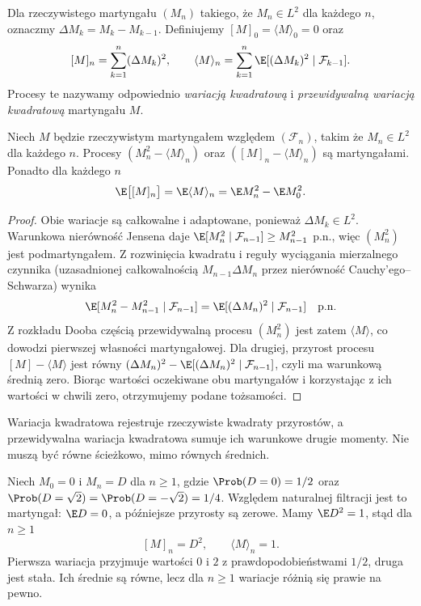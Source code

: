 \begin{definicja}
Dla rzeczywistego martyngału $(M_n)$ takiego,
że $M_n\in L^2$ dla każdego $n$, oznaczmy
$\Delta M_k=M_k-M_{k-1}$.
Definiujemy $[M]_0=\langle M\rangle_0=0$ oraz
\[
[M]_n=\sum_{k=1}^n(\Delta M_k)^2,\qquad
\langle M\rangle_n=\sum_{k=1}^n
\E[(\Delta M_k)^2\mid\mathcal F_{k-1}].
\]
Procesy te nazywamy odpowiednio \emph{wariacją
kwadratową} i \emph{przewidywalną wariacją
kwadratową} martyngału $M$.
\end{definicja}

\begin{stwierdzenie}
Niech $M$ będzie rzeczywistym martyngałem względem
$(\mathcal F_n)$, takim że $M_n\in L^2$ dla każdego $n$.
Procesy $(M_n^2-\langle M\rangle_n)$ oraz
$([M]_n-\langle M\rangle_n)$ są martyngałami.
Ponadto dla każdego $n$
\[
\E\bigl[[M]_n\bigr]=\E\langle M\rangle_n
=\E M_n^2-\E M_0^2.
\]
\end{stwierdzenie}
\begin{proof}
Obie wariacje są całkowalne i adaptowane,
ponieważ $\Delta M_k\in L^2$.
Warunkowa nierówność Jensena daje
$\E[M_n^2\mid\mathcal F_{n-1}]
\geq M_{n-1}^2$ p.n., więc $(M_n^2)$ jest
podmartyngałem. Z rozwinięcia kwadratu
i reguły wyciągania mierzalnego czynnika
(uzasadnionej całkowalnością $M_{n-1}\Delta M_n$
przez nierówność Cauchy'ego--Schwarza)
wynika
\[
\E[M_n^2-M_{n-1}^2\mid\mathcal F_{n-1}]
=\E[(\Delta M_n)^2\mid\mathcal F_{n-1}]
\quad\text{p.n.}
\]
Z rozkładu Dooba częścią przewidywalną procesu
$(M_n^2)$ jest zatem $\langle M\rangle$, co dowodzi
pierwszej własności martyngałowej.
Dla drugiej, przyrost procesu $[M]-\langle M\rangle$
jest równy
$(\Delta M_n)^2-\E[(\Delta M_n)^2\mid\mathcal F_{n-1}]$,
czyli ma warunkową średnią zero.
Biorąc wartości oczekiwane obu martyngałów
i korzystając z ich wartości w chwili zero,
otrzymujemy podane tożsamości.
\end{proof}

Wariacja kwadratowa rejestruje rzeczywiste
kwadraty przyrostów, a przewidywalna wariacja
kwadratowa sumuje ich warunkowe drugie momenty.
Nie muszą być równe ścieżkowo, mimo równych średnich.

\begin{przyklad}
Niech $M_0=0$ i $M_n=D$ dla $n\geq1$,
gdzie $\Prob(D=0)=1/2$ oraz
$\Prob(D=\sqrt{2})=\Prob(D=-\sqrt{2})=1/4$.
Względem naturalnej filtracji jest to martyngał:
$\E D=0$, a późniejsze przyrosty są zerowe.
Mamy $\E D^2=1$, stąd dla $n\geq1$
\[
[M]_n=D^2,\qquad \langle M\rangle_n=1.
\]
Pierwsza wariacja przyjmuje wartości $0$ i $2$
z prawdopodobieństwami $1/2$, druga jest stała.
Ich średnie są równe, lecz dla $n\geq1$
wariacje różnią się prawie na pewno.
\end{przyklad}

